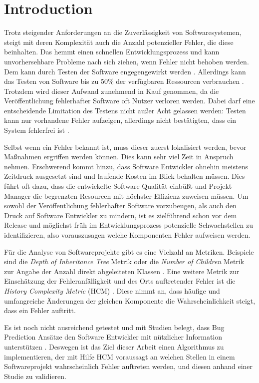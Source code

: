 \chapter{Introduction}
\label{chp:Einleitung}
Trotz steigender Anforderungen an die Zuverlässigkeit von Softwaresystemen, steigt mit deren Komplexität auch die Anzahl potenzieller Fehler, die diese beinhalten.
Das hemmt einen schnellen Entwicklungsprozess und kann unvorhersehbare Probleme nach sich ziehen, wenn Fehler nicht behoben werden.
Dem kann durch Testen der Software engegengewirkt werden \citep{Myers2004}.
Allerdings kann das Testen von Software bis zu 50\% der verfügbaren Ressourcen verbrauchen \citep{Beizer1990}.
Trotzdem wird dieser Aufwand zunehmend in Kauf genommen, da die Veröffentlichung fehlerhafter Software oft Nutzer verloren werden.
Dabei darf eine entscheidende Limitation des Testens nicht außer Acht gelassen werden: Testen kann nur vorhandene Fehler aufzeigen, allerdings nicht bestätigten, dass ein System fehlerfrei ist \citep{Ammann2008}.

Selbst wenn ein Fehler bekannt ist, muss dieser zuerst lokalisiert werden, bevor Maßnahmen ergriffen werden können.
Dies kann sehr viel Zeit in Anspruch nehmen.
Erschwerend kommt hinzu, dass Software Entwickler ohnehin meistens Zeitdruck ausgesetzt sind und laufende Kosten im Blick behalten m\"ussen.
Dies f\"uhrt oft dazu, dass die entwickelte Software Qualit\"at einb\"ußt und Projekt Manager die begrenzten Resourcen mit h\"ochster Effizienz zuweisen m\"ussen.
Um sowohl der Veröffentlichung fehlerhafter Software vorzubeugen, als auch den Druck auf Software Entwickler zu mindern, ist es zielführend schon vor dem Release und möglichst früh im Entwicklungsprozess potenzielle Schwachstellen zu identifizieren, also vorauszusagen welche Komponenten Fehler aufweisen werden.

Für die Analyse von Softwareprojekte gibt es eine Vielzahl an Metriken.
Beispiele sind die \textit{Depth of Inheritance Tree} Metrik oder die \textit{Number of Children} Metrik zur Angabe der Anzahl direkt abgeleiteten Klassen \citep{Gyimothy2005}.
Eine weitere Metrik zur Einschätzung der Fehleranfälligkeit und des Orts auftretender Fehler ist die \textit{History Complexity Metric} (HCM) \citep{Hassan2009}.
Diese nimmt an, dass häufige und umfangreiche Änderungen der gleichen Komponente die Wahrscheinlichkeit steigt, dass ein Fehler auftritt.

Es ist noch nicht ausreichend getestet und mit Studien belegt, dass Bug Prediction Ansätze den Software Entwickler mit nützlicher Information unterstützen \citep{Lewis2013}. Deswegen ist das Ziel dieser Arbeit einen Algorithmus zu implementieren, der mit Hilfe HCM voraussagt an welchen Stellen in einem Softwareprojekt wahrscheinlich Fehler auftreten werden, und diesen anhand einer Studie zu validieren.
